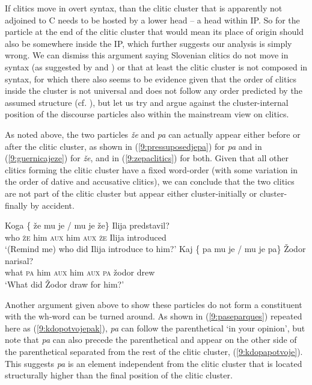 \documentclass[output=paper,
modfonts,
newtxmath,
hidelinks
]{langscibook}
\begin{document}
\noindent If clitics move in overt syntax, than the clitic cluster that is apparently not adjoined to C needs to be hosted by a lower head -- a head within IP. So for the particle at the end of the clitic cluster that would mean its place of origin should also be somewhere inside the IP, which  further suggests our analysis is simply wrong. We can dismiss this argument saying Slovenian clitics do not move in syntax (as suggested by \citealt{marusic2008clitics} and \citealt{marusiczaucer2017brno}) or that at least the clitic cluster is not composed in syntax, for which there also seems to be evidence given that the order of clitics inside the cluster is not universal and does not follow any order predicted by the assumed structure (cf. \citealt{marusiclecturenotes}), but let us try and argue against the cluster-internal position of the discourse particles also within the mainstream view on clitics. 

As noted above, the two particles \textit{že} and \textit{pa} can actually appear either before or after the clitic cluster, as shown in (\ref{9:pressuposedjepa}) for \textit{pa} and in (\ref{9:guernicajeze}) for \textit{že}, and in (\ref{9:zepaclitics}) for both. Given that all other clitics forming the clitic cluster have a fixed word-order (with some variation in the order of dative and accusative clitics), we can conclude that the two clitics are not part of the clitic cluster but appear either cluster-initially or cluster-finally by accident.

\begin{exe}
\ex \label{9:zepaclitics}
\begin{xlist}
\ex \gll 
Koga \{\hspace{-2pt} že mu je / mu je že\} Ilija predstavil?\\
who {} \textsc{že} him \textsc{aux} {} him \textsc{aux} \textsc{že} Ilija introduced\\
\trans 	 `(Remind me) who did Ilija introduce to him?'
\ex	\gll Kaj \{\hspace{-2pt} pa mu je / mu je pa\} Žodor narisal?\\
 		what {} \textsc{pa} him \textsc{aux} {} him \textsc{aux} \textsc{pa} žodor drew\\
\trans 	 `What did Žodor draw for him?'
\end{xlist}
\end{exe}

\noindent Another argument given above to show these particles do not form a constituent with the wh-word can be turned around. As shown in (\ref{9:paseparques}) repeated here as (\ref{9:kdopotvojepak}), \textit{pa} can follow the parenthetical `in your opinion', but note that \textit{pa} can also precede the parenthetical and appear on the other side of the parenthetical separated from the rest of the clitic cluster, (\ref{9:kdopapotvoje}). This suggests \textit{pa} is an element independent from the clitic cluster that is located structurally higher than the final position of the clitic cluster.
\end{document}
